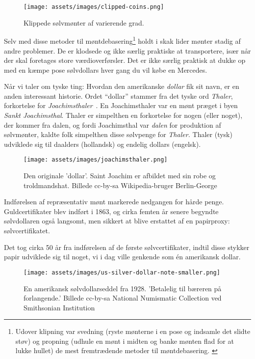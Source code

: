 \begin{figure}[htbp]
  \centering
  \texttt{[image: assets/images/clipped-coins.png]}
  \caption{Klippede sølvmønter af varierende grad.}
  \label{fig:clipped-coins}
\end{figure}

Selv med disse metoder til møntdebasering\footnote{Udover klipning var svedning
(ryste mønterne i en pose og indsamle det slidte støv) og propning
(udhule en mønt i midten og banke mønten flad for at lukke hullet)
de mest fremtrædende metoder til møntdebasering. \cite{wiki:coin-debasement}}
holdt i skak lider mønter stadig af andre problemer. De er klodsede og ikke 
særlig praktiske at transportere, især når der skal foretages store
værdioverførsler. Det er ikke særlig praktisk at dukke op med en kæmpe pose 
sølvdollars hver gang du vil købe en Mercedes.

Når vi taler om tyske ting: Hvordan den amerikanske \textit{dollar} fik sit 
navn, er en anden interessant historie. Ordet \enquote{dollar} stammer fra det 
tyske ord \textit{Thaler}, forkortelse for 
\textit{Joachimsthaler}~\cite{wiki:thaler}. En Joachimsthaler var en mønt
præget i byen \textit{Sankt Joachimsthal}. Thaler er simpelthen en forkortelse 
for nogen (eller noget), der kommer fra dalen, og fordi Joachimsthal var 
\textit{dalen} for produktion af sølvmønter, kaldte folk simpelthen disse 
sølvpenge for \textit{Thaler.} Thaler (tysk) udviklede sig til daalders 
(hollandsk) og endelig dollars (engelsk).


\begin{figure}[htbp]
  \centering
  \texttt{[image: assets/images/joachimsthaler.png]}
  \caption{Den originale 'dollar'. Saint Joachim er afbildet med 
  sin robe og troldmandshat. Billede cc-by-sa Wikipedia-bruger Berlin-George}
  \label{fig:joachimsthaler}
\end{figure}

Indførelsen af repræsentativ mønt markerede nedgangen for hårde
penge. Guldcertifikater blev indført i 1863, og cirka femten
år senere begyndte sølvdollaren også langsomt, men sikkert at blive
erstattet af en papirproxy: sølvcertifikatet. \cite{wiki:silver-certificate}

Det tog cirka 50 år fra indførelsen af de første sølvcertifikater, indtil
disse stykker papir udviklede sig til noget, vi i dag ville genkende som én
amerikansk dollar.

\begin{figure}[htbp]
  \centering
  \texttt{[image: assets/images/us-silver-dollar-note-smaller.png]}
  \caption{En amerikansk sølvdollarseddel fra 1928. 'Betalelig til 
  bæreren på forlangende.' Billede cc-by-sa National Numismatic Collection 
  ved Smithsonian Institution}
  \label{fig:us-silver-dollar-note-smaller}
\end{figure}


